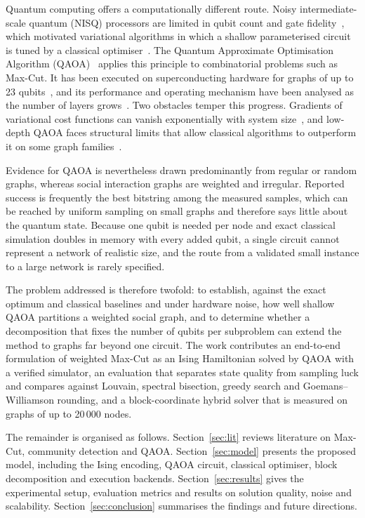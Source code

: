 \documentclass[pdflatex,sn-mathphys-num]{sn-jnl}
\theoremstyle{thmstyleone}
\theoremstyle{thmstyletwo}
\theoremstyle{thmstylethree}
\begin{document}
Quantum computing offers a computationally different route. Noisy intermediate-scale quantum (NISQ) processors are limited in qubit count and gate fidelity~\cite{preskill2018quantum}, which motivated variational algorithms in which a shallow parameterised circuit is tuned by a classical optimiser~\cite{peruzzo2014variational,cerezo2021variational}. The Quantum Approximate Optimisation Algorithm (QAOA)~\cite{farhi2014quantum} applies this principle to combinatorial problems such as Max-Cut. It has been executed on superconducting hardware for graphs of up to 23 qubits~\cite{harrigan2021quantum}, and its performance and operating mechanism have been analysed as the number of layers grows~\cite{zhou2020quantum}. Two obstacles temper this progress. Gradients of variational cost functions can vanish exponentially with system size~\cite{mcclean2018barren}, and low-depth QAOA faces structural limits that allow classical algorithms to outperform it on some graph families~\cite{bravyi2020obstacles}.

Evidence for QAOA is nevertheless drawn predominantly from regular or random graphs, whereas social interaction graphs are weighted and irregular. Reported success is frequently the best bitstring among the measured samples, which can be reached by uniform sampling on small graphs and therefore says little about the quantum state. Because one qubit is needed per node and exact classical simulation doubles in memory with every added qubit, a single circuit cannot represent a network of realistic size, and the route from a validated small instance to a large network is rarely specified.

The problem addressed is therefore twofold: to establish, against the exact optimum and classical baselines and under hardware noise, how well shallow QAOA partitions a weighted social graph, and to determine whether a decomposition that fixes the number of qubits per subproblem can extend the method to graphs far beyond one circuit. The work contributes an end-to-end formulation of weighted Max-Cut as an Ising Hamiltonian solved by QAOA with a verified simulator, an evaluation that separates state quality from sampling luck and compares against Louvain, spectral bisection, greedy search and Goemans--Williamson rounding, and a block-coordinate hybrid solver that is measured on graphs of up to 20\,000 nodes.

The remainder is organised as follows. Section~\ref{sec:lit} reviews literature on Max-Cut, community detection and QAOA. Section~\ref{sec:model} presents the proposed model, including the Ising encoding, QAOA circuit, classical optimiser, block decomposition and execution backends. Section~\ref{sec:results} gives the experimental setup, evaluation metrics and results on solution quality, noise and scalability. Section~\ref{sec:conclusion} summarises the findings and future directions.
\end{document}
